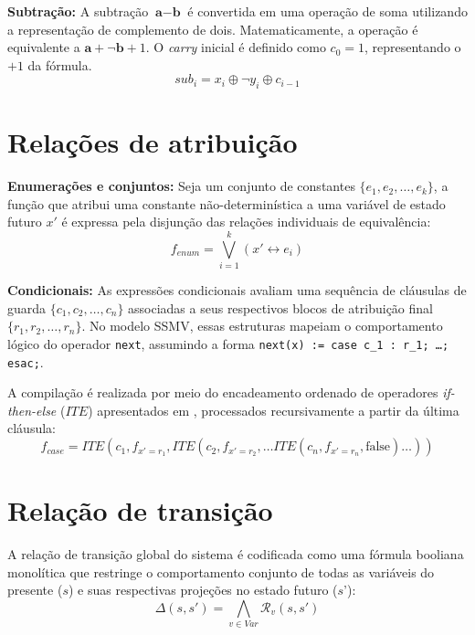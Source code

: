 \documentclass[cic,tc]{infufrgs}
\begin{document}
	\vspace{1em}
	\noindent \textbf{Subtração:}
	\label{sec:cod_sub}
	A subtração $\textbf{a} - \textbf{b}$ é convertida em uma operação de soma utilizando a representação de complemento de dois. Matematicamente, a operação é equivalente a $\textbf{a} + \neg \textbf{b} + 1$. O \textit{carry} inicial é definido como $c_0 = 1$, representando o $+1$ da fórmula.
	\begin{equation}
		sub_i = x_i \oplus \neg y_i \oplus c_{i-1}
	\end{equation}
	
	\section{Relações de atribuição}
	\label{sec:cod_atrib}
	
	\vspace{1em}
	\noindent \textbf{Enumerações e conjuntos:}
	\label{sec:cod_atrib_enum}
	Seja um conjunto de constantes $\{e_1, e_2, \dots, e_k\}$, a função que atribui uma constante não-determinística a uma variável de estado futuro $x'$ é expressa pela disjunção das relações individuais de equivalência:
	\begin{equation}
		f_{enum} = \bigvee_{i=1}^k (x' \leftrightarrow e_i)
		\label{eq:atrib_enum}
	\end{equation}
	
	\vspace{1em}
	\noindent \textbf{Condicionais:}
	\label{sec:cod_atrib_cond}
	As expressões condicionais avaliam uma sequência de cláusulas de guarda $\{c_1, c_2, \dots, c_n\}$ associadas a seus respectivos blocos de atribuição final $\{r_1, r_2, \dots, r_n\}$. No modelo SSMV, essas estruturas mapeiam o comportamento lógico do operador \texttt{next}, assumindo a forma \texttt{next(x) := case c\_1 : r\_1; \dots; esac;}.
	
	A compilação é realizada por meio do encadeamento ordenado de operadores \textit{if-then-else} ($ITE$) apresentados em , processados recursivamente a partir da última cláusula:
	\begin{equation}
		f_{case} = ITE(c_1, f_{x'=r_1}, ITE(c_2, f_{x'=r_2}, \dots ITE(c_n, f_{x'=r_n}, \text{false}) \dots ))
		\label{eq:cond}
	\end{equation}
	
	\section{Relação de transição}
	\label{sec:cod_transic}
	A relação de transição global do sistema é codificada como uma fórmula booliana monolítica que restringe o comportamento conjunto de todas as variáveis do presente ($s$) e suas respectivas projeções no estado futuro ($s$'):
	\begin{equation}
		\Delta(s, s') = \bigwedge_{v \in Var} \mathcal{R}_v(s, s')
	\end{equation}
	
\end{document}
